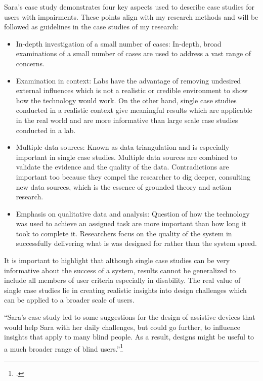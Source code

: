Sara’s case study demonstrates four key aspects used to describe case studies for users with impairments.  These points align with my research methods and will be followed as guidelines in the case studies of my research:

\begin{itemize}
    \item In-depth investigation of a small number of cases: In-depth, broad examinations of a small number of cases are used to address a vast range of concerns.
    
    \item Examination in context: Labs have the advantage of removing undesired external influences which is not a realistic or credible environment to show how the technology would work. On the other hand, single case studies conducted in a realistic context give meaningful results which are applicable in the real world and are more informative than large scale case studies conducted in a lab.
    
    \item Multiple data sources: Known as data triangulation and is especially important in single case studies. Multiple data sources are combined to validate the evidence and the quality of the data. Contradictions are important too because they compel the researcher to dig deeper, consulting new data sources, which is the essence of grounded theory and action research.
    
    \item Emphasis on qualitative data and analysis: Question of how the technology was used to achieve an assigned task are more important than how long it took to complete it. Researchers focus on the quality of the system in successfully delivering what is was designed for rather than the system speed. 
\end{itemize}

It is important to highlight that although single case studies can be very informative about the success of a system, results cannot be generalized to include all members of user criteria especially in disability. The real value of single case studies lie in creating realistic insights into design challenges which can be applied to a broader scale of users.

``Sara’s case study led to some suggestions for the design of assistive devices that would help Sara with her daily challenges, but could go further, to influence insights that apply to many blind people.  As a result, designs might be useful to a much broader range of blind users.''\footcite{Shinohara2009}

